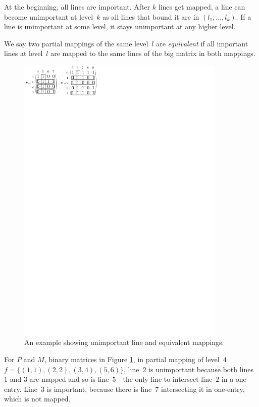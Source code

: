 At the beginning, all lines are important. After $k$ lines get mapped, a line can become unimportant at level~$k$ as all lines that bound it are in $(l_1,\dots,l_k)$. If a line is unimportant at some level, it stays unimportant at any higher level.
\begin{defn}
We say two partial mappings of the same level~$l$ are \emph{equivalent} if all important lines at level~$l$ are mapped to the same lines of the big matrix in both mappings.
\end{defn}
\begin{figure}[h!]
\centering
\includegraphics[width=100mm]{../img/equivalent.pdf}
\caption{An example showing unimportant line and equivalent mappings.}
\label{equivalent}
\end{figure}
For $P$ and $M$, binary matrices in Figure \ref{equivalent}, in partial mapping of level~$4$ $f=\{(1,1),(2,2),(3,4),(5,6)\}$, line~$2$ is unimportant because both lines $1$ and $3$ are mapped and so is line~$5$ - the only line to intersect line~$2$ in a one-entry. Line~$3$ is important, because there is line~$7$ intersecting it in one-entry, which is not mapped.

